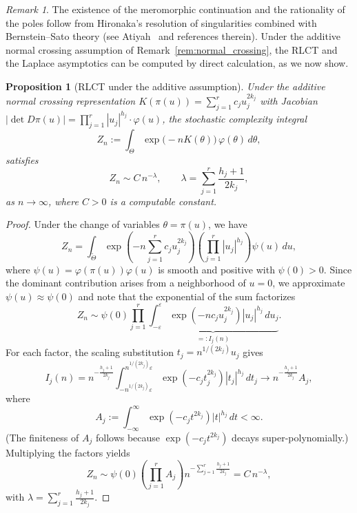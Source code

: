 \documentclass[11pt,letterpaper]{amsart}
\numberwithin{equation}{section}
\theoremstyle{plain}
\newtheorem{proposition}[theorem]{Proposition}
\theoremstyle{definition}
\theoremstyle{remark}
\newtheorem{remark}[theorem]{Remark}
\begin{document}
\begin{remark}
The existence of the meromorphic continuation and the rationality of the poles follow from Hironaka's resolution of singularities combined with Bernstein--Sato theory (see Atiyah~\cite{Watanabe2009} and references therein). Under the additive normal crossing assumption of Remark~\ref{rem:normal_crossing}, the RLCT and the Laplace asymptotics can be computed by direct calculation, as we now show.
\end{remark}

\begin{proposition}[RLCT under the additive assumption]
\label{prop:RLCT_additive}
Under the additive normal crossing representation $K(\pi(u)) = \sum_{j=1}^r c_j u_j^{2k_j}$ with Jacobian $|\det D\pi(u)| = \prod_{j=1}^r |u_j|^{h_j} \cdot \varphi(u)$, the stochastic complexity integral
\[
Z_n := \int_{\Theta} \exp\big(-n K(\theta)\big) \, \varphi(\theta)\, d\theta,
\]
satisfies
\[
Z_n \sim C \, n^{-\lambda},
\qquad
\lambda = \sum_{j=1}^r \frac{h_j + 1}{2k_j},
\]
as $n \to \infty$, where $C > 0$ is a computable constant.
\end{proposition}

\begin{proof}
Under the change of variables $\theta = \pi(u)$, we have
\[
Z_n
=
\int_{\widetilde{\Theta}} \exp\left(-n \sum_{j=1}^r c_j u_j^{2k_j}\right)
\left( \prod_{j=1}^r |u_j|^{h_j} \right) \psi(u)\, du,
\]
where $\psi(u) = \varphi(\pi(u))\varphi(u)$ is smooth and positive with $\psi(0) > 0$. Since the dominant contribution arises from a neighborhood of $u=0$, we approximate $\psi(u) \approx \psi(0)$ and note that the exponential of the sum factorizes
\[
Z_n \sim \psi(0) \prod_{j=1}^r \underbrace{\int_{-\varepsilon}^{\varepsilon} \exp(-n c_j u_j^{2k_j}) |u_j|^{h_j} \, du_j}_{=: I_j(n)}.
\]
For each factor, the scaling substitution $t_j = n^{1/(2k_j)} u_j$ gives
\[
I_j(n)
=
n^{-\frac{h_j+1}{2k_j}} \int_{-n^{1/(2k_j)}\varepsilon}^{n^{1/(2k_j)}\varepsilon} \exp(-c_j t_j^{2k_j}) |t_j|^{h_j} \, dt_j
\longrightarrow
n^{-\frac{h_j+1}{2k_j}} A_j,
\]
where
\[
A_j := \int_{-\infty}^{\infty} \exp(-c_j t^{2k_j}) |t|^{h_j}\, dt < \infty.
\]
(The finiteness of $A_j$ follows because $\exp(-c_j t^{2k_j})$ decays super-polynomially.) Multiplying the factors yields
\[
Z_n \sim \psi(0) \left(\prod_{j=1}^r A_j\right) n^{-\sum_{j=1}^r \frac{h_j+1}{2k_j}} = C \, n^{-\lambda},
\]
with $\lambda = \sum_{j=1}^r \frac{h_j+1}{2k_j}$.
\end{proof}
\end{document}
